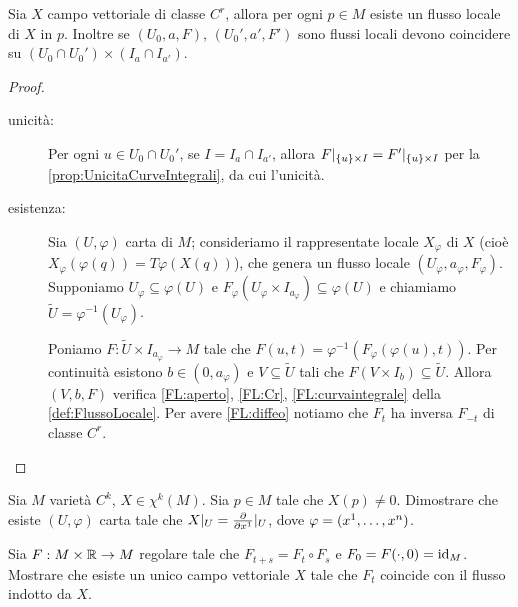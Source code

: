\begin{proposition}  \label{prop:EsistenzaUnicitaFlussiLocali}
	Sia $X$ campo vettoriale di classe $C^r$, allora per ogni $p\in M$ esiste un flusso locale di $X$ in $p$. Inoltre se $(U_0,a,F)$, $(U_0',a',F')$ sono flussi locali devono coincidere su $(U_0\cap U_0')\times (I_a\cap I_{a'})$.
\end{proposition}
\begin{proof}
	\begin{description}
	\item [unicità:]
	Per ogni $u\in U_0\cap U_0'$, se $I=I_a\cap I_{a'}$, allora $F\restrict{\{u\}\times I}=F'\restrict{\{u\}\times I}$ per la \cref{prop:UnicitaCurveIntegrali}, da cui l'unicità.
	
	\item [esistenza:]
	Sia $(U,\varphi)$ carta di $M$; %
	consideriamo il rappresentate locale $X_\varphi$ di $X$ (cioè $X_\varphi(\varphi(q))=T\varphi(X(q))$), che genera un flusso locale $(U_\varphi,a_\varphi,F_\varphi)$.
	Supponiamo $U_\varphi\subseteq \varphi(U)$ e $F_\varphi(U_\varphi\times I_{a_\varphi})\subseteq \varphi(U)$ e chiamiamo $\tilde U=\varphi^{-1}(U_\varphi)$.
	
	Poniamo  $F:\tilde U\times I_{a_\varphi}\to M$ tale che $F(u,t)=\varphi^{-1}(F_\varphi(\varphi(u),t))$.
	Per continuità esistono $b\in(0,a_\varphi)$ e $V\subseteq \tilde U$ tali che $F(V\times I_b)\subseteq \tilde U$. %
	Allora $(V,b,F)$ verifica \ref{FL:aperto}, \ref{FL:Cr}, \ref{FL:curvaintegrale} della \cref{def:FlussoLocale}. Per avere \ref{FL:diffeo} notiamo che $F_t$ ha inversa $F_{-t}$ di classe $C^r$.
	\end{description}
\end{proof}

\begin{exercise}
	Sia $M$ varietà $C^k$, $X\in\chi^k(M)$. Sia $p\in M$ tale che $X(p)\not=0$. Dimostrare che esiste $(U,\varphi)$ carta tale che $X\restrict U=\frac{\partial}{\partial x^1}\restrict U$, dove $\varphi=(\seqa xn,)$.
\end{exercise}	

\begin{exercise}
	Sia $F:M\times\R\to M$ regolare tale che $F_{t+s}=F_t\circ F_s$ e $F_0=F(\cdot,0)=\id_M$. Mostrare che esiste un unico campo vettoriale $X$ tale che $F_t$ coincide con il flusso indotto da $X$.
\end{exercise}

